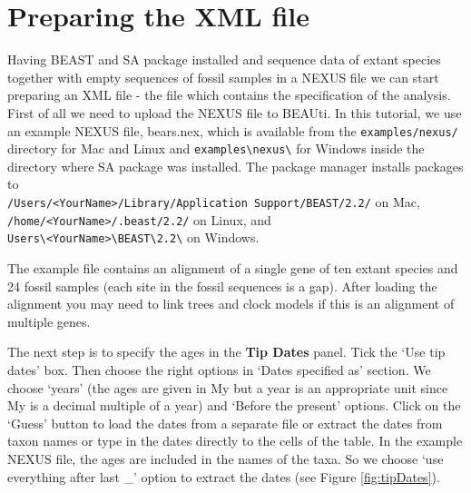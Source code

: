 \documentclass[12pt]{article}
\begin{document}
\section{Preparing the XML file}

Having BEAST and SA package installed and sequence data of extant species together with empty sequences of fossil samples in a NEXUS file we can start preparing an XML file - the file which contains the specification of the analysis. First of all we need to upload the NEXUS file to BEAUti. In this tutorial, we use an example NEXUS file, bears.nex, which is available from the {\tt examples/nexus/} directory for Mac and Linux and  {\tt examples\textbackslash nexus\textbackslash} for Windows inside the directory where SA package was installed. The package manager installs packages to \\
{\tt /Users/<YourName>/Library/Application Support/BEAST/2.2/} on Mac, \\
{\tt /home/<YourName>/.beast/2.2/} on Linux, and \\
{\tt Users\textbackslash<YourName>\textbackslash BEAST\textbackslash 2.2\textbackslash} on Windows.

The example file contains an alignment of a single gene of ten extant species and 24 fossil samples (each site in the fossil sequences is a gap).   
After loading the alignment you may need to link trees and clock models if this is an alignment of multiple genes. 

The next step is to specify the ages in the {\bf Tip Dates} panel. Tick the `Use tip dates' box. Then choose the right options in `Dates specified as' section. We choose `years' (the ages are given in My but a year is an appropriate unit since My is a decimal multiple of a year) and `Before the present' options.  Click on the `Guess' button to load the dates from a separate file or extract the dates from taxon names or type in the dates directly to the cells of the table.  In the example NEXUS file, the ages are included in the names of the taxa. So we choose `use everything after last \_' option to extract the dates (see Figure \ref{fig:tipDates}).
\end{document}
